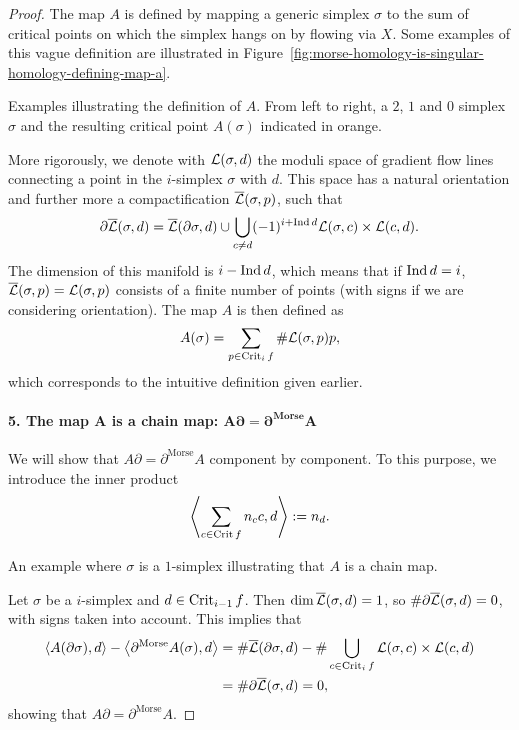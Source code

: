 \begin{proof}
    The map $A$ is defined by mapping a generic simplex $\sigma$ to the sum of critical points on which the simplex hangs on by flowing via $X$.
    Some examples of this vague definition are illustrated in Figure~\ref{fig:morse-homology-is-singular-homology-defining-map-a}.
    \begin{marginfigure}
        \centering
        \caption{
            Examples illustrating the definition of $A$.
            From left to right, a $2$, $1$ and  $0$ simplex $\sigma$ and the resulting critical point $A(\sigma)$ indicated in orange.
        }
        \label{fig:morse-homology-is-singular-homology-defining-map-a}
    \end{marginfigure}
    More rigorously, we denote with $\mathcal L(\sigma, d)$ the moduli space of gradient flow lines connecting a point in the $i$-simplex $\sigma$ with $d$. 
    This space has a natural orientation and further more a compactification $\overline{\mathcal L}(\sigma, p)$, such that
    \[
    \partial \overline{\mathcal L}(\sigma, d) = \overline{\mathcal L}(\partial \sigma, d) \cup \bigcup_{c \neq d}  (-1)^{i + \operatorname{Ind} d} \mathcal L(\sigma, c) \times \mathcal L(c, d)
    .\] 
    The dimension of this manifold is $i - \operatorname{Ind} d$, which means that if  $\operatorname{Ind} d = i$,  $\overline{\mathcal L}(\sigma, p) = \mathcal L(\sigma, p)$ consists of a finite number of points (with signs if we are considering orientation).
    The map $A$ is then defined as
    \[
        A(\sigma) = \sum_{p \in \operatorname{Crit}_i f} \# \mathcal L(\sigma, p) p
    ,\] 
    which corresponds to the intuitive definition given earlier.


    \paragraph{5. The map  $\bm A$ is a chain map:  $\bm{A \partial = \partial^{\text{Morse}} A}$ }
    We will show that $A \partial = \partial^{\text{Morse}} A$ component by component. To this purpose, we introduce the inner product
    \[
    \left<\sum_{c \in \operatorname{Crit} f} n_c c, d \right> := n_d
    .\] 
\begin{marginfigure}
    \centering
    \caption{An example where $\sigma$ is a $1$-simplex illustrating that  $A$ is a chain map.}
    \label{fig:a-is-a-chain-map}
\end{marginfigure}

    Let $\sigma$ be a  $i$-simplex and $d \in \operatorname{Crit}_{i-1} f$.
    Then $\dim \overline{\mathcal L}(\sigma, d) = 1$, so  $\# \partial \overline{\mathcal L}(\sigma, d) = 0$, with signs taken into account.
    This implies that
    \begin{align*}
        \left<A(\partial \sigma), d \right> - \left<\partial^{\text{Morse}} A (\sigma) ,d\right> &= \# \overline{\mathcal L}(\partial \sigma, d) - \# \bigcup_{c \in  \operatorname{Crit}_i f} \mathcal L(\sigma, c) \times  \mathcal L(c, d)\\
                                                                                                 &= \# \partial \overline{\mathcal L}(\sigma, d) = 0
    ,\end{align*} 
    showing that $A \partial = \partial^{\text{Morse}} A$.



\end{proof}
